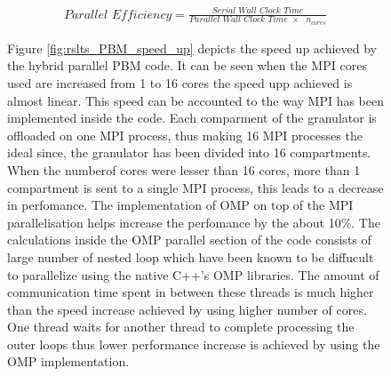 \documentclass[preprint,11pt,authoryear]{elsarticle}
\begin{document}
\begin{align}
\textit{Parallel Efficiency} = \frac{\textit{Serial Wall Clock Time}}{\textit{Parallel Wall Clock Time $\times$ $n_{cores}$}}
\label{eqn:rslts_PBM_parallel_efficiency}
\end{align}
\begin{figure}[H]
Figure \ref{fig:rslts_PBM_speed_up} depicts the speed up achieved by the hybrid parallel PBM code. It can be seen when the MPI cores used are increased from 1 to 16 cores the speed upp achieved is almost linear. This speed can be accounted to the way MPI has been implemented inside the code. Each comparment of the granulator is  offloaded on one MPI process, thus making 16 MPI processes the ideal since, the granulator has been divided into 16 compartments. When the numberof cores were lesser than 16 cores, more than 1 compartment is sent to a single MPI process, this leads to a decrease in perfomance. The implementation of OMP on top of the MPI parallelisation helps increase the perfomance by the about 10\%. The calculations inside the OMP parallel section of the code consists of large number of nested loop which have been known to be diffucult to parallelize \citep{He2016} using the native C++'s OMP libraries. The amount of communication time spent in between these threads is much higher than the speed increase achieved by using higher number of cores. One thread waits for another thread to complete processing the outer loops thus lower performance increase is achieved by using the OMP implementation. \\


\end{figure}
\end{document}
